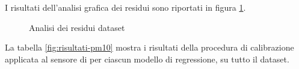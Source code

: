 I risultati dell'analisi grafica dei residui sono riportati in figura \ref{fig:residui_pm10}.

\begin{figure}[H]
\centering
{}\hfil
{}

\hfil
{}
\caption{Analisi dei residui dataset }
\label{fig:residui_pm10}
\end{figure}

La tabella \ref{fig:risultati-pm10} mostra i risultati della procedura di calibrazione applicata al sensore di  per ciascun modello di regressione, su tutto il dataset.

